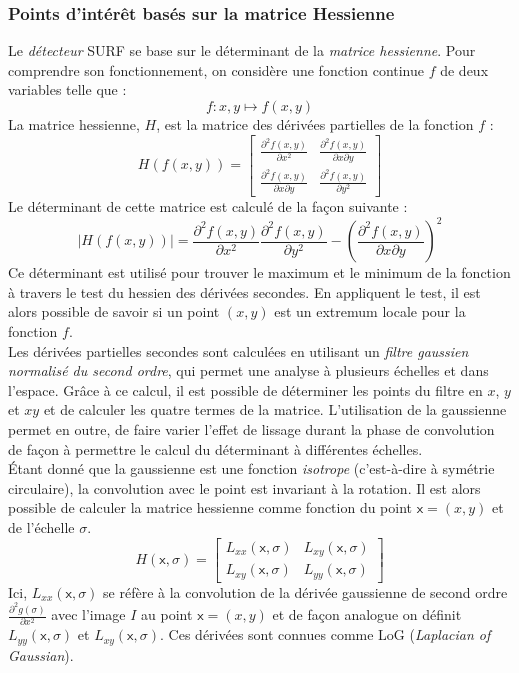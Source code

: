 \documentclass[a4paper,12pt]{report}
\begin{document}
\subsubsection{Points d'intérêt basés sur la matrice Hessienne}
Le \textit{détecteur} SURF se base sur le déterminant de la \textit{matrice hessienne}. Pour comprendre son fonctionnement, on considère une fonction continue $f$ de deux variables telle que :
$$f:x,y\mapsto f(x,y)$$
La matrice hessienne, $H$, est la matrice des dérivées partielles de la fonction $f$ :
$$
H(f(x,y))=
\begin{bmatrix}
\frac {\partial^2 f(x,y)}{\partial x^2} &\frac {\partial^2 f(x,y)}{\partial x \partial y} \\
\frac {\partial^2 f(x,y)}{\partial x \partial y} &\frac {\partial^2 f(x,y)}{\partial y^2}
\end{bmatrix}
$$
Le déterminant de cette matrice est calculé de la façon suivante :
$$\left|H(f(x,y))\right|=\frac{\partial^2 f(x,y)}{\partial x^2} \frac{\partial^2 f(x,y)}{\partial y^2} - \left(\frac{\partial^2 f(x,y)}{\partial x \partial y}\right)^2 $$
Ce déterminant est utilisé pour trouver le maximum et le minimum de la fonction à travers le test du hessien des dérivées secondes. En appliquent le test, il est alors possible de savoir si un point $(x,y)$ est un extremum locale pour la fonction $f$.\\
Les dérivées partielles secondes sont calculées en utilisant un \textit{filtre gaussien normalisé du second ordre}, qui permet une analyse à plusieurs échelles et dans l'espace. Grâce à ce calcul, il est possible de déterminer les points du filtre en $x$, $y$ et $xy$ et de calculer les quatre termes de la matrice. L'utilisation de la gaussienne permet en outre, de faire varier l'effet de lissage durant la phase de convolution de façon à permettre le calcul du déterminant à différentes échelles.
\\\'Etant donné que la gaussienne est une fonction \textit{isotrope} (c'est-à-dire à symétrie circulaire), la convolution avec le point est invariant à la rotation. Il est alors possible de calculer la matrice hessienne comme fonction du point $\mathsf{x}=(x,y)$ et de l'échelle $\sigma$.
$$
H(\mathsf{x},\sigma)=
\begin{bmatrix}
L_{xx}(\mathsf{x},\sigma) &L_{xy}(\mathsf{x},\sigma)\\
L_{xy}(\mathsf{x},\sigma) &L_{yy}(\mathsf{x},\sigma)
\end{bmatrix}
$$
Ici, $L_{xx}(\mathsf{x},\sigma)$ se réfère à la convolution de la dérivée gaussienne de second ordre $\frac{\partial^2 g(\sigma)}{\partial x^2}$ avec l'image $I$ au point $\mathsf{x}=(x,y)$ et de façon analogue on définit $L_{yy}(\mathsf{x},\sigma)$ et $L_{xy}(\mathsf{x},\sigma)$. Ces dérivées sont connues comme LoG (\textit{Laplacian of Gaussian}).
\end{document}
